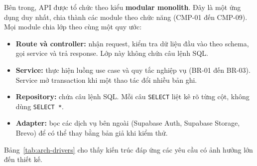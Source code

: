 Bên trong, API được tổ chức theo kiểu \textbf{modular monolith}. Đây là một ứng dụng duy nhất, chia thành các module theo chức năng (CMP-01 đến CMP-09). Mọi module chia lớp theo cùng một quy ước:
\begin{itemize}
  \item \textbf{Route và controller:} nhận request, kiểm tra dữ liệu đầu vào theo schema, gọi service và trả response. Lớp này không chứa câu lệnh SQL.
  \item \textbf{Service:} thực hiện luồng use case và quy tắc nghiệp vụ (BR-01 đến BR-03). Service mở transaction khi một thao tác đổi nhiều bản ghi.
  \item \textbf{Repository:} chứa câu lệnh SQL. Mỗi câu \texttt{SELECT} liệt kê rõ từng cột, không dùng \texttt{SELECT *}.
  \item \textbf{Adapter:} bọc các dịch vụ bên ngoài (Supabase Auth, Supabase Storage, Brevo) để có thể thay bằng bản giả khi kiểm thử.
\end{itemize}

Bảng~\ref{tab:arch-drivers} cho thấy kiến trúc đáp ứng các yêu cầu có ảnh hưởng lớn đến thiết kế.

